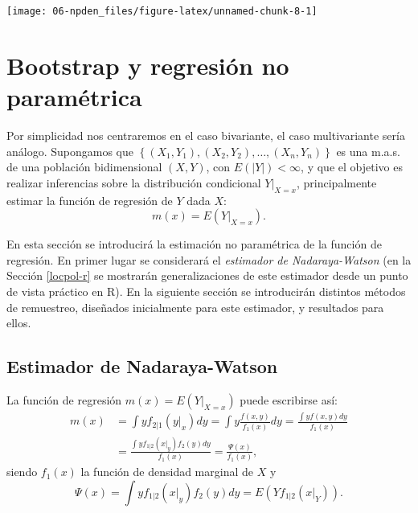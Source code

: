 \documentclass[
]{book}
\theoremstyle{break}
\theoremstyle{definition}
\theoremstyle{definition}
\theoremstyle{definition}
\theoremstyle{remark}
\begin{document}
\begin{center}\texttt{[image: 06-npden\_files/figure-latex/unnamed-chunk-8-1]} \end{center}

\hypertarget{npreg}{%
\chapter{Bootstrap y regresión no paramétrica}\label{npreg}}

Por simplicidad nos centraremos en el caso bivariante, el caso multivariante sería análogo.
Supongamos que \(\left\{ \left( X_1,Y_1 \right),\left( X_2,Y_2 \right), \ldots, \left( X_n,Y_n \right) \right\}\) es una m.a.s. de una población bidimensional \(\left( X,Y \right)\), con \(E\left( \left\vert Y\right\vert \right) <\infty\), y que el objetivo es realizar inferencias sobre la distribución condicional \(\left. Y \right\vert_{X=x}\), principalmente estimar la función de regresión de \(Y\) dada \(X\):
\[m\left( x \right) =E\left( \left. Y\right\vert_{X=x} \right).\]

En esta sección se introducirá la estimación no paramétrica de la función de regresión.
En primer lugar se considerará el \emph{estimador de Nadaraya-Watson} (en la Sección \ref{locpol-r} se mostrarán generalizaciones de este estimador desde un punto de vista práctico en R).
En la siguiente sección se introducirán distintos métodos de remuestreo, diseñados inicialmente para este estimador, y resultados para ellos.

\hypertarget{nadaraya-watson}{%
\section{Estimador de Nadaraya-Watson}\label{nadaraya-watson}}

La función de regresión \(m\left( x \right) =E\left( \left. Y\right\vert_{X=x} \right)\) puede escribirse así:
\[\begin{aligned}
m\left( x \right) &= \int yf_{2|1}\left( \left. y\right\vert _{x} \right)
dy=\int y\frac{f\left( x,y \right)}{f_1\left( x \right)}dy=\frac{\int
yf\left( x,y \right) dy}{f_1\left( x \right)} \\
&= \frac{\int yf_{1|2}\left( \left. x\right\vert _{y} \right) f_2\left(
y \right) dy}{f_1\left( x \right)}=\frac{\Psi \left( x \right)}{f_1\left(
x \right)},
\end{aligned}\]
siendo \(f_1\left( x \right)\) la función de densidad marginal de \(X\) y
\[\Psi \left( x \right) =\int yf_{1|2}\left( \left. x\right\vert _{y} \right)
f_2\left( y \right) dy=E\left( Yf_{1|2}\left( \left. x\right\vert_{Y} \right)
\right).\]
\end{document}
